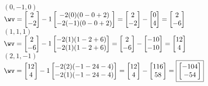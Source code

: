\begin{parts}
\begin{subparts}
\begin{soln}
    $(0, -1, 0)$\\[0.05 in]
    $\wv = \begin{bmatrix}
    2 \\ -2
    \end{bmatrix} - 1 \begin{bmatrix}
    -2(0)(0-0+2) \\
    -2(-1)(0-0+2)
    \end{bmatrix} = \begin{bmatrix}
    2 \\ -2
    \end{bmatrix} - \begin{bmatrix}
    0 \\ 4
    \end{bmatrix} = 
    \begin{bmatrix}
    2 \\ -6
    \end{bmatrix}$\\
    
    $(1,1,1)$\\[0.05 in]
    $\wv = \begin{bmatrix}
    2 \\ -6
    \end{bmatrix} - 1 \begin{bmatrix}
    -2(1)(1-2+6) \\
    -2(1)(1-2+6)
    \end{bmatrix} = \begin{bmatrix}
    2 \\ -6
    \end{bmatrix} - \begin{bmatrix}
    -10 \\ -10
    \end{bmatrix} = 
    \begin{bmatrix}
    12 \\ 4
    \end{bmatrix}$\\
    
    $(2, 1, -1)$\\[0.05 in]
    $\wv = \begin{bmatrix}
    12 \\ 4
    \end{bmatrix} - 1 \begin{bmatrix}
    -2(2)(-1-24-4) \\
    -2(1)(-1-24-4)
    \end{bmatrix} = \begin{bmatrix}
    12 \\ 4
    \end{bmatrix} - \begin{bmatrix}
    116 \\ 58
    \end{bmatrix} = \boxed{\begin{bmatrix}
    -104 \\ -54
    \end{bmatrix}}$
    \end{soln}


\end{subparts}
\end{parts}
